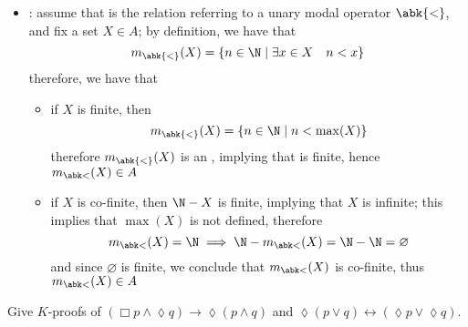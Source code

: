 \documentclass[a4paper, 12pt]{report}
\begin{document}
{\begin{itemize}
                \begin{itemize}
                    \item if $X$ is finite, then $\N - X$ is co-finite, hence $\N - X \in A$
                    \item if $X$ is co-finite, then $\N - X$ is finite, hence $\N - X \in A$
                \end{itemize}
            \item {}: assume that \curlyquotes{<} is the relation referring to a unary modal operator $\abk{<}$, and fix a set $X \in A$; by definition, we have that $$m_{\abk{<}}(X) = \{n \in \N \mid \exists x \in X \quad n < x\}$$ therefore, we have that

                \begin{itemize}
                    \item if $X$ is finite, then $$m_{\abk{<}}(X)= \{n \in \N \mid n < \max(X)\}$$ therefore $m_{\abk{<}}(X)$ is an , implying that is finite, hence $m_{\abk <}(X) \in A$
                    \item if $X$ is co-finite, then $\N - X$ is finite, implying that $X$ is infinite; this implies that $\max (X)$ is not defined, therefore $$m_{\abk <}(X) = \N \implies \N - m_{\abk <}(X) = \N - \N = \varnothing$$ and since $\varnothing$ is finite, we conclude that $m_{\abk <}(X)$ is co-finite, thus $m_{\abk <}(X) \in A$
                \end{itemize}
        \end{itemize}
    }

     Give $K$-proofs of $(\Box p \land \lozenge q) \to \lozenge (p \land q)$ and $\lozenge (p \lor q) \leftrightarrow (\lozenge p \lor \lozenge q)$.
\end{document}
